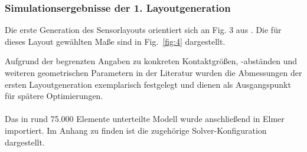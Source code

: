 \documentclass[12pt, a4paper]{article}
\begin{document}
\subsubsection{Simulationsergebnisse der 1. Layoutgeneration}
Die erste Generation des Sensorlayouts orientiert sich an Fig. 3 aus \cite{cres23}. Die für dieses Layout gewählten Maße sind in Fig.~\ref{fig:4} dargestellt.\newline

Aufgrund der begrenzten Angaben zu konkreten Kontaktgrößen, -abständen und weiteren geometrischen Parametern in der Literatur wurden die Abmessungen der ersten Layoutgeneration exemplarisch festgelegt und dienen als Ausgangspunkt für spätere Optimierungen.\paragraph{}

Das in rund 75.000 Elemente unterteilte Modell wurde anschließend in Elmer importiert. Im Anhang zu finden ist die zugehörige Solver-Konfiguration dargestellt.\paragraph{}
\end{document}
